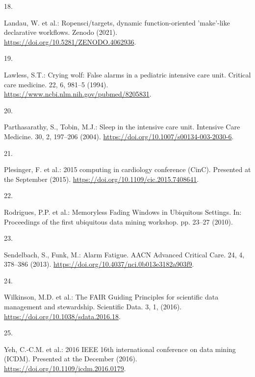 \documentclass[runningheads]{llncs}
\newlength{\cslhangindent}
\newlength{\csllabelwidth}
\newenvironment{CSLReferences}[2] %
 {%
  \setlength{\parindent}{0pt}
  \ifodd #1 \everypar{\setlength{\hangindent}{\cslhangindent}}\ignorespaces\fi
  \ifnum #2 > 0
  \setlength{\parskip}{#2\baselineskip}
  \fi
 }%
 {}
\newcommand{\CSLLeftMargin}[1]{\parbox[t]{\csllabelwidth}{#1}}
\newcommand{\CSLRightInline}[1]{\parbox[t]{\linewidth - \csllabelwidth}{#1}\break}
\begin{document}
\begin{CSLReferences}{0}{0}
\leavevmode{}%
\CSLLeftMargin{18. }
\CSLRightInline{Landau, W. et al.: Ropensci/targets, dynamic
function-oriented 'make'-like declarative workflows. Zenodo (2021).
\url{https://doi.org/10.5281/ZENODO.4062936}.}

\leavevmode{}%
\CSLLeftMargin{19. }
\CSLRightInline{Lawless, S.T.: Crying wolf: False alarms in a pediatric
intensive care unit. Critical care medicine. 22, 6, 981--5 (1994).
\url{https://www.ncbi.nlm.nih.gov/pubmed/8205831}.}

\leavevmode{}%
\CSLLeftMargin{20. }
\CSLRightInline{Parthasarathy, S., Tobin, M.J.: Sleep in the intensive
care unit. Intensive Care Medicine. 30, 2, 197--206 (2004).
\url{https://doi.org/10.1007/s00134-003-2030-6}.}

\leavevmode{}%
\CSLLeftMargin{21. }
\CSLRightInline{Plesinger, F. et al.: 2015 computing in cardiology
conference (CinC). Presented at the September (2015).
\url{https://doi.org/10.1109/cic.2015.7408641}.}

\leavevmode{}%
\CSLLeftMargin{22. }
\CSLRightInline{Rodrigues, P.P. et al.: {Memoryless Fading Windows in
Ubiquitous Settings}. In: Proceedings of the first ubiquitous data
mining workshop. pp. 23--27 (2010).}

\leavevmode{}%
\CSLLeftMargin{23. }
\CSLRightInline{Sendelbach, S., Funk, M.: Alarm Fatigue. AACN Advanced
Critical Care. 24, 4, 378--386 (2013).
\url{https://doi.org/10.4037/nci.0b013e3182a903f9}.}

\leavevmode{}%
\CSLLeftMargin{24. }
\CSLRightInline{Wilkinson, M.D. et al.: The FAIR Guiding Principles for
scientific data management and stewardship. Scientific Data. 3, 1,
(2016). \url{https://doi.org/10.1038/sdata.2016.18}.}

\leavevmode{}%
\CSLLeftMargin{25. }
\CSLRightInline{Yeh, C.-C.M. et al.: 2016 IEEE 16th international
conference on data mining (ICDM). Presented at the December (2016).
\url{https://doi.org/10.1109/icdm.2016.0179}.}

\end{CSLReferences}
\end{document}
